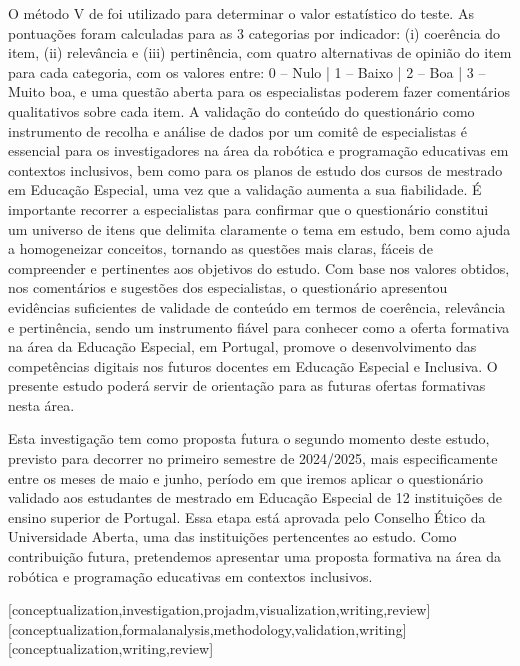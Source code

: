\documentclass[portuguese]{textolivre}
\begin{document}
O método V de \textcite{aiken_content_1980} foi utilizado para determinar o valor estatístico do teste. As pontuações foram calculadas para as 3 categorias por indicador: (i) coerência do item, (ii) relevância e (iii) pertinência, com quatro alternativas de opinião do item para cada categoria, com os valores entre: 0 – Nulo | 1 – Baixo | 2 – Boa | 3 – Muito boa, e uma questão aberta para os especialistas poderem fazer comentários qualitativos sobre cada item. A validação do conteúdo do questionário como instrumento de recolha e análise de dados por um comitê de especialistas é essencial para os investigadores na área da robótica e programação educativas em contextos inclusivos, bem como para os planos de estudo dos cursos de mestrado em Educação Especial, uma vez que a validação aumenta a sua fiabilidade. É importante recorrer a especialistas para confirmar que o questionário constitui um universo de itens que delimita claramente o tema em estudo, bem como ajuda a homogeneizar conceitos, tornando as questões mais claras, fáceis de compreender e pertinentes aos objetivos do estudo. Com base nos valores obtidos, nos comentários e sugestões dos especialistas, o questionário apresentou evidências suficientes de validade de conteúdo em termos de coerência, relevância e pertinência, sendo um instrumento fiável para conhecer como a oferta formativa na área da Educação Especial, em Portugal, promove o desenvolvimento das competências digitais nos futuros docentes em Educação Especial e Inclusiva. O presente estudo poderá servir de orientação para as futuras ofertas formativas nesta área.

Esta investigação tem como proposta futura o segundo momento deste estudo, previsto para decorrer no primeiro semestre de 2024/2025, mais especificamente entre os meses de maio e junho, período em que iremos aplicar o questionário validado aos estudantes de mestrado em Educação Especial de 12 instituições de ensino superior de Portugal. Essa etapa está aprovada pelo Conselho Ético da Universidade Aberta, uma das instituições pertencentes ao estudo. Como contribuição futura, pretendemos apresentar uma proposta formativa na área da robótica e programação educativas em contextos inclusivos.



\printbibliography\label{sec-bib}
\begin{contributors}
[conceptualization,investigation,projadm,visualization,writing,review]
[conceptualization,formalanalysis,methodology,validation,writing]
[conceptualization,writing,review]
\end{contributors}
\end{document}
